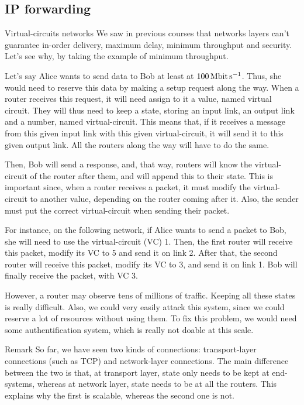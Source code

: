 \documentclass[a4paper]{article}
\begin{document}
\subsection{IP forwarding}
\begin{parag}{Virtual-circuits networks}
    We saw in previous courses that networks layers can't guarantee in-order delivery, maximum delay, minimum throughput and security. Let's see why, by taking the example of minimum throughput.

    Let's say Alice wants to send data to Bob at least at $\SI{100}{\mega\bit \per \second }$. Thus, she would need to reserve this data by making a setup request along the way. When a router receives this request, it will need assign to it a value, named virtual circuit. They will thus need to keep a state, storing an input link, an output link and a number, named virtual-circuit. This means that, if it receives a message from this given input link with this given virtual-circuit, it will send it to this given output link. All the routers along the way will have to do the same.

    Then, Bob will send a response, and, that way, routers will know the virtual-circuit of the router after them, and will append this to their state. This is important since, when a router receives a packet, it must modify the virtual-circuit to another value, depending on the router coming after it. Also, the sender must put the correct virtual-circuit when sending their packet.

    For instance, on the following network, if Alice wants to send a packet to Bob, she will need to use the virtual-circuit (VC) 1. Then, the first router will receive this packet, modify its VC to 5 and send it on link 2. After that, the second router will receive this packet, modify its VC to 3, and send it on link 1. Bob will finally receive the packet, with VC 3.

    However, a router may observe tens of millions of traffic. Keeping all these states is really difficult. Also, we could very easily attack this system, since we could reserve a lot of resources without using them. To fix this problem, we would need some authentification system, which is really not doable at this scale.

    \begin{subparag}{Remark}
        So far, we have seen two kinds of connections: transport-layer connections (such as TCP) and network-layer connections. The main difference between the two is that, at transport layer, state only needs to be kept at end-systems, whereas at network layer, state needs to be at all the routers. This explains why the first is scalable, whereas the second one is not.
    \end{subparag}
\end{parag}
\end{document}
